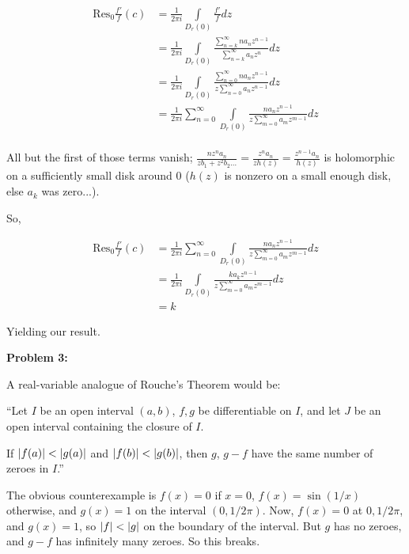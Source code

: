 \documentclass[a4paper,12pt]{article}
\begin{document}
\begin{align*} %
\text{Res}_0 \frac{f'}{f} (c) &= \frac{1}{2\pi i} \int\limits_{D_r(0)} \frac{f'}{f} dz\\
&= \frac{1}{2\pi i} \int\limits_{D_r(0)} \frac{\sum\limits_{n=k}^\infty na_nz^{n-1}}{\sum\limits_{n=k}^\infty a_nz^n} dz\\
&= \frac{1}{2\pi i} \int\limits_{D_r(0)} \frac{\sum\limits_{n=0}^\infty na_nz^{n-1}}{z\sum\limits_{n=0}^\infty a_{n}z^{n-1}} dz\\
&= \frac{1}{2\pi i} \sum\limits_{n=0}^\infty \int\limits_{D_r(0)} \frac{na_nz^{n-1}}{z\sum\limits_{m=0}^\infty a_{m}z^{m-1}} dz\\
\end{align*} 

All but the first of those terms vanish; $\frac{nz^na_n}{zb_1 + z^2b_2 \ldots } = \frac{z^na_n}{zh(z)} = \frac{z^{n-1}a_n}{h(z)}$ is holomorphic on a sufficiently small disk around $0$ ($h(z)$ is nonzero on a small enough disk, else $a_k$ was zero...).

So, 

\begin{align*}
\text{Res}_0 \frac{f'}{f} (c) &= \frac{1}{2\pi i} \sum\limits_{n=0}^\infty \int\limits_{D_r(0)} \frac{na_nz^{n-1}}{z\sum\limits_{m=0}^\infty a_{m}z^{m-1}} dz\\
&= \frac{1}{2\pi i} \int\limits_{D_r(0)} \frac{ka_kz^{n-1}}{z\sum\limits_{m=0}^\infty a_{m}z^{m-1}} dz\\
&= k
\end{align*} %

Yielding our result. 

\shunt

{\bf Problem 3:}

A real-variable analogue of Rouche's Theorem would be:

``Let $I$ be an open interval $(a,b)$, $f,g$ be differentiable on $I$, and let $J$ be an open interval containing the closure of $I$.

If $\left\lvert f(a) \right\rvert < \left\lvert g(a) \right\rvert$ and $\left\lvert f(b) \right\rvert < \left\lvert g(b) \right\rvert$, then $g$, $g-f$ have the same number of zeroes in $I$.''

The obvious counterexample is $f(x) = 0$ if $x = 0$, $f(x) = \sin(1/x)$ otherwise, and $g(x) =1$ on the interval $(0,1/2\pi)$. Now, $f(x) = 0$ at $0,1/2\pi$, and $g(x) =1$, so $\left\lvert f \right\rvert < \left\lvert g \right\rvert$ on the boundary of the interval. But $g$ has no zeroes, and $g-f$ has infinitely many zeroes. So this breaks.
\end{document}

